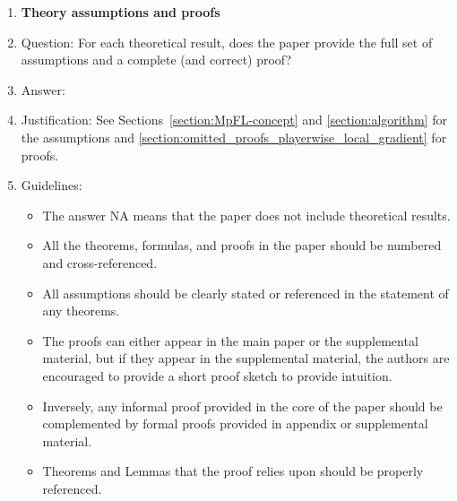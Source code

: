 \documentclass{article}
\theoremstyle{plain}
\theoremstyle{remark}
\begin{document}
\begin{enumerate}
\item {\bf Theory assumptions and proofs}
    \item[] Question: For each theoretical result, does the paper provide the full set of assumptions and a complete (and correct) proof?
    \item[] Answer: \answerYes{} %
    \item[] Justification: See Sections~\ref{section:MpFL-concept} and \ref{section:algorithm} for the assumptions and \cref{section:omitted_proofs_playerwise_local_gradient} for proofs.
    \item[] Guidelines:
    \begin{itemize}
        \item The answer NA means that the paper does not include theoretical results. 
        \item All the theorems, formulas, and proofs in the paper should be numbered and cross-referenced.
        \item All assumptions should be clearly stated or referenced in the statement of any theorems.
        \item The proofs can either appear in the main paper or the supplemental material, but if they appear in the supplemental material, the authors are encouraged to provide a short proof sketch to provide intuition. 
        \item Inversely, any informal proof provided in the core of the paper should be complemented by formal proofs provided in appendix or supplemental material.
        \item Theorems and Lemmas that the proof relies upon should be properly referenced. 
    \end{itemize}


\end{enumerate}
\end{document}
